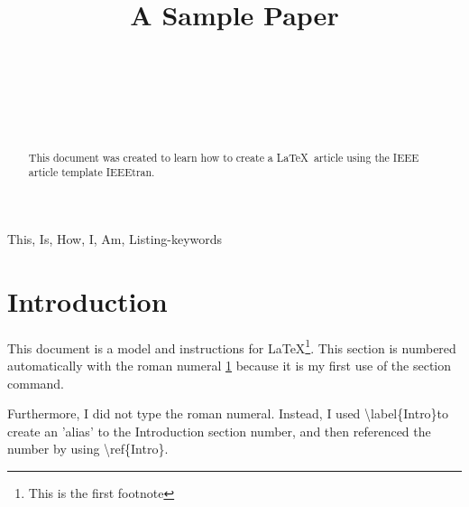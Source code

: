 \documentclass[conference]{IEEEtran}
\begin{document}
\title{A Sample Paper\\
}

\author{
 \\
\and
{}
 \\
\and
{}
 \\
}
\maketitle

\begin{abstract}
This document was created to learn how to create a \LaTeX\ article using the IEEE article template IEEEtran.
\end{abstract}

\begin{IEEEkeywords}
This, Is, How, I, Am, Listing-keywords
\end{IEEEkeywords}

\section{Introduction}\label{Intro}
This document is a model and instructions for \LaTeX\footnote{This is the first footnote}.
This section is numbered automatically with the roman numeral \ref{Intro} because it is my first use of the section command.

Furthermore, I did not type the roman numeral. Instead, I used \textbackslash label\{Intro\}\footnotemark to create an 'alias' to the Introduction section number, and then referenced the number by using \textbackslash ref\{Intro\}\footnotemark[\value{footnote}].

\end{document}
